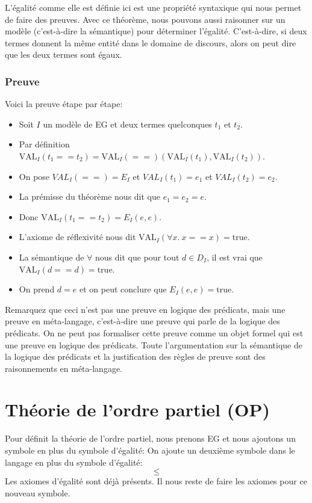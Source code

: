 {L'égalité comme elle est définie ici est une propriété syntaxique qui nous permet de faire des preuves.
Avec ce théorème, nous pouvons aussi raisonner sur un modèle (c'est-à-dire la sémantique) pour déterminer l'égalité.
C'est-à-dire, si deux termes donnent la même entité dans le domaine de discours, alors on peut dire que les
deux termes sont égaux.

\subsubsection{Preuve}

Voici la preuve étape par étape:
\begin{itemize}
\item Soit $I$ un modèle de EG et deux termes quelconques $t_{1}$ et $t_{2}$.
\item Par définition $\mathrm{VAL}_{I}(t_{1} == t_{2}) = \mathrm{VAL}_{I}(==)(\mathrm{VAL}_{I}(t_{1}), \mathrm{VAL}_{I}(t_{2}))$.
\item On pose $VAL_{I}(==) = E_{I}$ et $VAL_{I}(t_{1}) = e_1$ et $VAL_{I}(t_{2}) = e_2$.
\item La prémisse du théorème nous dit que $e_1 = e_2 = e$.
\item Donc $\mathrm{VAL}_{I}(t_{1} == t_{2}) =E_{I}(e,e)$.
\item L'axiome de réflexivité nous dit $\mathrm{VAL}_{I}(\forall x.\ x==x)= \mathrm{true}$.
\item La sémantique de $\forall$ nous dit que pour tout $d \in D_I$, il est vrai que $\mathrm{VAL}_{I}(d==d)=\mathrm{true}$.
\item On prend $d=e$ et on peut conclure que $E_{I}(e,e)=\mathrm{true}$.
\end{itemize}

\vspace{\baselineskip}
Remarquez que ceci n'est pas une preuve en logique des prédicats, mais une preuve en méta-langage, c'est-à-dire
une preuve qui parle de la logique des prédicats.
On ne peut pas formaliser cette preuve comme un objet formel qui est une preuve en logique des prédicats.
Toute l'argumentation sur la sémantique de la logique des prédicats et la justification des règles de preuve
sont des raisonnements en méta-langage.

\section{Théorie de l'ordre partiel (OP)}

Pour définit la théorie de l'ordre partiel, nous prenons EG et nous ajoutons un symbole en
plus du symbole d'égalité:
On ajoute un deuxième symbole dans le langage en plus du symbole d'égalité:
	$$\leq$$
Les axiomes d'égalité sont déjà présents.
Il nous reste de faire les axiomes pour ce nouveau symbole.

}
